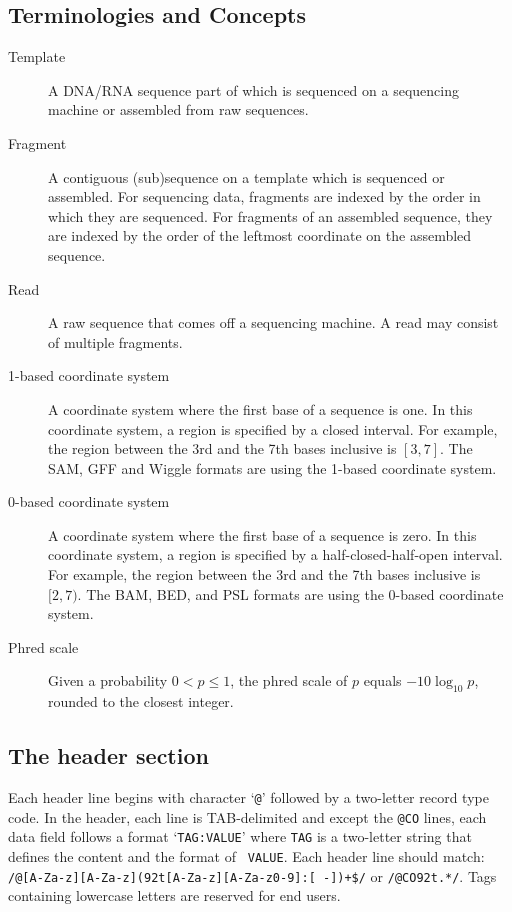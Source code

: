 \documentclass[10pt]{article}
\begin{document}
\pagebreak

\subsection{Terminologies and Concepts}

\begin{description}
\item[Template] A DNA/RNA sequence part of which is sequenced on a
  sequencing machine or assembled from raw sequences.
\item[Fragment] A contiguous (sub)sequence on a template which is
  sequenced or assembled. For sequencing data, fragments are indexed by
  the order in which they are sequenced. For fragments of an assembled
  sequence, they are indexed by the order of the leftmost coordinate on
  the assembled sequence.
\item[Read] A raw sequence that comes off a sequencing machine. A read
  may consist of multiple fragments.
\item[1-based coordinate system] A coordinate system where the first
  base of a sequence is one. In this coordinate system, a region is
  specified by a closed interval. For example, the region between the
  3rd and the 7th bases inclusive is $[3,7]$. The SAM, GFF and Wiggle
  formats are using the 1-based coordinate system.
\item[0-based coordinate system] A coordinate system where the first
  base of a sequence is zero. In this coordinate system, a region is
  specified by a half-closed-half-open interval. For example, the region
  between the 3rd and the 7th bases inclusive is $[2,7)$. The BAM, BED,
  and PSL formats are using the 0-based coordinate system.
\item[Phred scale] Given a probability $0<p\le 1$, the phred scale of $p$
  equals $-10\log_{10}p$, rounded to the closest integer.
\end{description}

\subsection{The header section}
Each header line begins with character `{\tt @}' followed by a
two-letter record type code. In the header, each line is TAB-delimited
and except the {\tt @CO} lines, each data field follows a format `{\tt TAG:VALUE}' where {\tt TAG}
is a two-letter string that defines the content and the format of {\tt
  VALUE}. Each header line should match: {\tt
  /@[A-Za-z][A-Za-z](\char92t[A-Za-z][A-Za-z0-9]:[
  -])+\$/} or {\tt /@CO\char92t.*/}. Tags containing lowercase letters are reserved for
end users.
\end{document}
